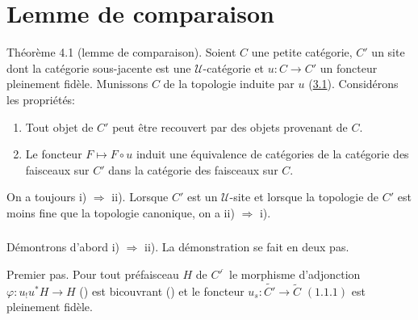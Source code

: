 \documentclass[10pt]{../fichiers-configuration-latex/smfart}
\begin{document}
\section{Lemme de comparaison}\pageoriginale

\begin{enonce*}{Théorème 4.1}
{\rm(lemme de comparaison)}. Soient $C$ une petite catégorie,
$C'$ un site dont la catégorie sous-jacente est une
$𝒰$-catégorie et $u:C\rightarrow C'$ un foncteur
pleinement fidèle. Munissons $C$ de la topologie induite par $u$
{\rm(\hyperref[III.subsec3.1]{3.1}).} Considérons les propriétés:
\begin{enumerate}
\renewcommand{\theenumi}{\roman{enumi}}
\renewcommand{\labelenumi}{\theenumi)}
\item Tout objet de $C'$ peut être recouvert par des objets
provenant de $C$.

\item Le foncteur $F\mapsto F\circ u$ induit une équivalence de
catégories de la catégorie des faisceaux sur $C'$ dans la
catégorie des faisceaux sur $C$.
\end{enumerate}

On a toujours {\rm i) $\Rightarrow$ ii).} Lorsque $C'$ est un
$𝒰$-site et lorsque la topologie de $C'$ est moins fine que
la topologie canonique, on a {\rm ii) $\Rightarrow$ i).}
\end{enonce*}

\setcounter{subsection}{1}
\subsubsection{}
Démontrons d'abord i) $\Rightarrow$ ii). La démonstration se
fait en deux pas.

Premier pas. Pour tout préfaisceau $H$ de
${C'}^{\widehat{\phantom{,}}}$ le morphisme d'adjonction
$\varphi:u_{!}u^{\ast}H\rightarrow H$ {\rm()} est
bicouvrant {\rm()} et le foncteur
$u_s:\widetilde{C'}\rightarrow \widetilde{C}$ $(1.1.1)$ est
pleinement fidèle.
\end{document}
